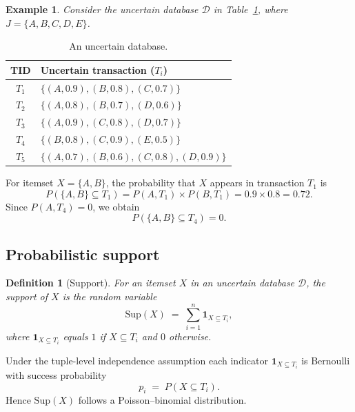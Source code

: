 \documentclass[10pt,letterpaper]{article}
\newtheorem{definition}{Definition}[section]
\newtheorem{example}{Example}[section]
\newcounter{definition}
\newcounter{example}
\begin{document}
\begin{example}
\label{ex:uncertain-db}
Consider the uncertain database $\mathcal{D}$ in Table~\ref{tab:uncertain_db}, where $J=\{A,B,C,D,E\}$.
\end{example}

\begin{table}[H]
\caption{An uncertain database.}
\label{tab:uncertain_db}
\centering
\begin{tabular}{c l}
\hline
\textbf{TID} & \textbf{Uncertain transaction ($T_i$)} \\
\hline
$T_1$ & $\{(A,0.9),(B,0.8),(C,0.7)\}$ \\
$T_2$ & $\{(A,0.8),(B,0.7),(D,0.6)\}$ \\
$T_3$ & $\{(A,0.9),(C,0.8),(D,0.7)\}$ \\
$T_4$ & $\{(B,0.8),(C,0.9),(E,0.5)\}$ \\
$T_5$ & $\{(A,0.7),(B,0.6),(C,0.8),(D,0.9)\}$ \\
\hline
\end{tabular}
\end{table}

For itemset $X=\{A,B\}$, the probability that $X$ appears in transaction $T_1$ is
\begin{equation}
P(\{A,B\}\subseteq T_1) = P(A,T_1) \times P(B,T_1) = 0.9 \times 0.8 = 0.72.
\end{equation}
Since $P(A,T_4)=0$, we obtain
\begin{equation}
P(\{A,B\}\subseteq T_4) = 0.
\end{equation}

\subsection*{Probabilistic support}
\label{subsec:prob_support}

\begin{definition}[Support]
\label{def:support}
For an itemset $X$ in an uncertain database $\mathcal{D}$, the support of $X$ is the random variable
\begin{equation}
\mathrm{Sup}(X) \;=\; \sum_{i=1}^n \mathbf{1}_{X\subseteq T_i},
\label{eq:Sup}
\end{equation}
where $\mathbf{1}_{X\subseteq T_i}$ equals $1$ if $X\subseteq T_i$ and $0$ otherwise.
\end{definition}

Under the tuple-level independence assumption each indicator $\mathbf{1}_{X\subseteq T_i}$ is Bernoulli with success probability
\begin{equation}
p_i \;=\; P(X\subseteq T_i).
\label{eq:pi}
\end{equation}
Hence $\mathrm{Sup}(X)$ follows a Poisson--binomial distribution.
\end{document}
